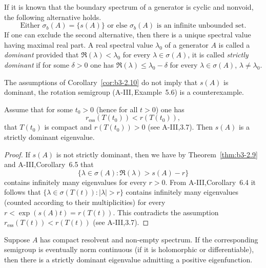 If it is known that the boundary spectrum of a generator is cyclic and nonvoid, the following alternative holds.
\begin{equation}\label{eq:b3-2.19}
\text{Either $\sigma_{b}(A) = \{ s(A) \} $ or else  $\sigma_{b}(A)$ is an infinite unbounded set.}
\end{equation}
If one can exclude the second alternative, then there is a unique spectral value having maximal real part.
A real spectral value $\lambda_{0}$ of a generator $A$ is called a \emph{dominant} provided that $\Re(\lambda) < \lambda_{0}$ for every $\lambda \in \sigma(A)$, it is called \emph{strictly dominant} if for some $\delta > 0$ one has $\Re(\lambda) \leq \lambda_{0} - \delta$ for every $\lambda \in \sigma(A)$, $\lambda \neq \lambda_{0}$.

The assumptions of Corollary~\ref{cor:b3-2.10} do not imply that $s(A)$ is dominant, the rotation semigroup (A-III,\,Example~5.6) is a counterexample.
\begin{corollary}\label{cor:b3-2.11}
	Assume that for some $t_{0} > 0$ (hence for all $t > 0$) one has 
    \[
    r_{\text{ess}}(T(t_{0})) < r(T(t_{0})), 
    \]
    \eg that $T(t_{0})$ is compact and $r(T(t_{0})) > 0$ (see A-III,3.7).
	Then $s(A)$ is a strictly dominant eigenvalue.
\end{corollary}
\begin{proof}
	If $s(A)$ is not strictly dominant, then we have by Theorem~\ref{thm:b3-2.9} and A-III,Corollary~6.5 that 
    \[
    \{\lambda \in \sigma(A) \colon \Re(\lambda) > s(A) - r\}
    \]
    contains infinitely many eigenvalues for every $r > 0$.
	From A-III,Corollary~6.4 it follows that $\{\lambda \in \sigma(T(t)) \colon |\lambda| > r\}$ contains infinitely many eigenvalues (counted according to their multiplicities) for every $r < \exp(s(A)t) = r(T(t))$.
	This contradicts the assumption $r_{\text{ess}}(T(t)) < r(T(t))$ (see A-III,3.7).
\end{proof}
\begin{corollary}\label{cor:b3-2.12}
	Suppose $A$ has compact resolvent and non-empty spectrum.
	If the corresponding semigroup is eventually norm continuous (\eg if it is holomorphic or differentiable), then there is a strictly dominant eigenvalue admitting a positive eigenfunction.
\end{corollary}

